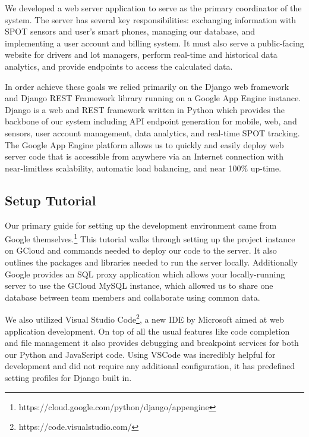 

We developed a web server application to serve as the primary coordinator of the system.
The server has several key responsibilities: exchanging information with SPOT sensors and user's smart phones, managing our database, and implementing a user account and billing system.
It must also serve a public-facing website for drivers and lot managers, perform real-time and historical data analytics, and provide endpoints to access the calculated data.

In order achieve these goals we relied primarily on the Django web framework and Django REST Framework library running on a Google App Engine instance.
Django is a web and REST framework written in Python which provides the backbone of our system including API endpoint generation for mobile, web, and sensors, user account management, data analytics, and real-time SPOT tracking.
The Google App Engine platform allows us to quickly and easily deploy web server code that is accessible from anywhere via an Internet connection with near-limitless scalability, automatic load balancing, and near 100\% up-time.

\subsection{Setup Tutorial}
Our primary guide for setting up the development environment came from Google themselves.\footnote{https://cloud.google.com/python/django/appengine}
This tutorial walks through setting up the project instance on GCloud and commands needed to deploy our code to the server.
It also outlines the packages and libraries needed to run the server locally.
Additionally Google provides an SQL proxy application which allows your locally-running server to use the GCloud MySQL instance, which allowed us to share one database between team members and collaborate using common data.

We also utilized Visual Studio Code\footnote{https://code.visualstudio.com/}, a new IDE by Microsoft aimed at web application development.  On top of all the usual features like code completion and file management it also provides debugging and breakpoint services for both our Python and JavaScript code.
Using VSCode was incredibly helpful for development and did not require any additional configuration, it has predefined setting profiles for Django built in.

